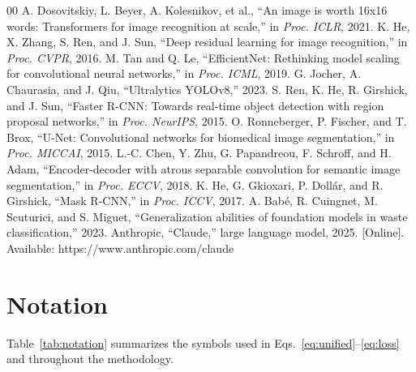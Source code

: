 \documentclass[conference]{IEEEtran}
\begin{document}
\begin{thebibliography}{00}
 A. Dosovitskiy, L. Beyer, A. Kolesnikov, et al., ``An image is worth 16x16 words: Transformers for image recognition at scale,'' in \textit{Proc. ICLR}, 2021.
 K. He, X. Zhang, S. Ren, and J. Sun, ``Deep residual learning for image recognition,'' in \textit{Proc. CVPR}, 2016.
 M. Tan and Q. Le, ``EfficientNet: Rethinking model scaling for convolutional neural networks,'' in \textit{Proc. ICML}, 2019.
 G. Jocher, A. Chaurasia, and J. Qiu, ``Ultralytics YOLOv8,'' 2023.
 S. Ren, K. He, R. Girshick, and J. Sun, ``Faster R-CNN: Towards real-time object detection with region proposal networks,'' in \textit{Proc. NeurIPS}, 2015.
 O. Ronneberger, P. Fischer, and T. Brox, ``U-Net: Convolutional networks for biomedical image segmentation,'' in \textit{Proc. MICCAI}, 2015.
 L.-C. Chen, Y. Zhu, G. Papandreou, F. Schroff, and H. Adam, ``Encoder-decoder with atrous separable convolution for semantic image segmentation,'' in \textit{Proc. ECCV}, 2018.
 K. He, G. Gkioxari, P. Doll\'ar, and R. Girshick, ``Mask R-CNN,'' in \textit{Proc. ICCV}, 2017.
 A. Bab\'e, R. Cuingnet, M. Scuturici, and S. Miguet, ``Generalization abilities of foundation models in waste classification,'' 2023.
 Anthropic, ``Claude,'' large language model, 2025. [Online]. Available: https://www.anthropic.com/claude
\end{thebibliography}



\appendices

\section{Notation}
\label{app:notation}
Table~\ref{tab:notation} summarizes the symbols used in
Eqs.~\eqref{eq:unified}--\eqref{eq:loss} and throughout the methodology.
\end{document}
